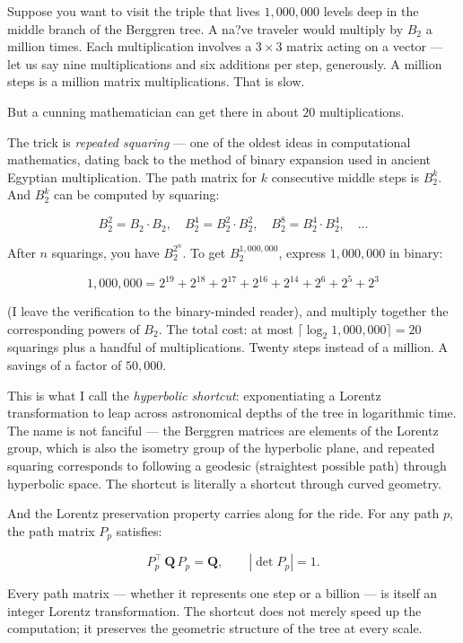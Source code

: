 Suppose you want to visit the triple that lives $1{,}000{,}000$ levels deep in the middle branch of the Berggren tree. A na?ve traveler would multiply by $B_2$ a million times. Each multiplication involves a $3 \times 3$ matrix acting on a vector --- let us say nine multiplications and six additions per step, generously. A million steps is a million matrix multiplications. That is slow.

But a cunning mathematician can get there in about $20$ multiplications.

The trick is \textit{repeated squaring} --- one of the oldest ideas in computational mathematics, dating back to the method of binary expansion used in ancient Egyptian multiplication. The path matrix for $k$ consecutive middle steps is $B_2^k$. And $B_2^k$ can be computed by squaring:

\[
B_2^2 = B_2 \cdot B_2, \quad B_2^4 = B_2^2 \cdot B_2^2, \quad B_2^8 = B_2^4 \cdot B_2^4, \quad \ldots
\]

After $n$ squarings, you have $B_2^{2^n}$. To get $B_2^{1{,}000{,}000}$, express $1{,}000{,}000$ in binary:

\[
1{,}000{,}000 = 2^{19} + 2^{18} + 2^{17} + 2^{16} + 2^{14} + 2^{6} + 2^5 + 2^3
\]

(I leave the verification to the binary-minded reader), and multiply together the corresponding powers of $B_2$. The total cost: at most $\lceil \log_2 1{,}000{,}000 \rceil = 20$ squarings plus a handful of multiplications. Twenty steps instead of a million. A savings of a factor of $50{,}000$.

This is what I call the \textit{hyperbolic shortcut}: exponentiating a Lorentz transformation to leap across astronomical depths of the tree in logarithmic time. The name is not fanciful --- the Berggren matrices are elements of the Lorentz group, which is also the isometry group of the hyperbolic plane, and repeated squaring corresponds to following a geodesic (straightest possible path) through hyperbolic space. The shortcut is literally a shortcut through curved geometry.

And the Lorentz preservation property carries along for the ride. For any path $p$, the path matrix $P_p$ satisfies:

\[
P_p^\top \, \mathbf{Q} \, P_p = \mathbf{Q}, \qquad |\det P_p| = 1.
\]

Every path matrix --- whether it represents one step or a billion --- is itself an integer Lorentz transformation. The shortcut does not merely speed up the computation; it preserves the geometric structure of the tree at every scale.

